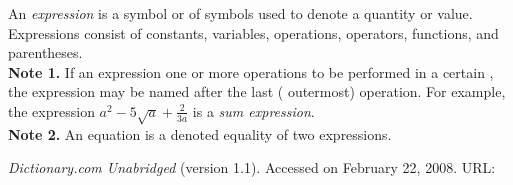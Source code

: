 \documentclass[12pt]{article}
\begin{document}
An \emph{expression} is a symbol or  of symbols used to denote a quantity or value.  Expressions consist of constants, variables, operations, operators, functions, and parentheses.\\

\textbf{Note 1.}  If an expression  one or more operations to be performed in a certain , the expression may be named after the last ( outermost) operation.  For example, the expression $\displaystyle a^2-5\sqrt{a}+\frac{2}{3a}$ is a {\em sum expression}.\\

\textbf{Note 2.}  An equation is a denoted equality of two expressions.

\begin{thebibliography}{9}
 \emph{Dictionary.com Unabridged} (version 1.1).  Accessed on February 22, 2008.  URL: 
\end{thebibliography}
\end{document}
